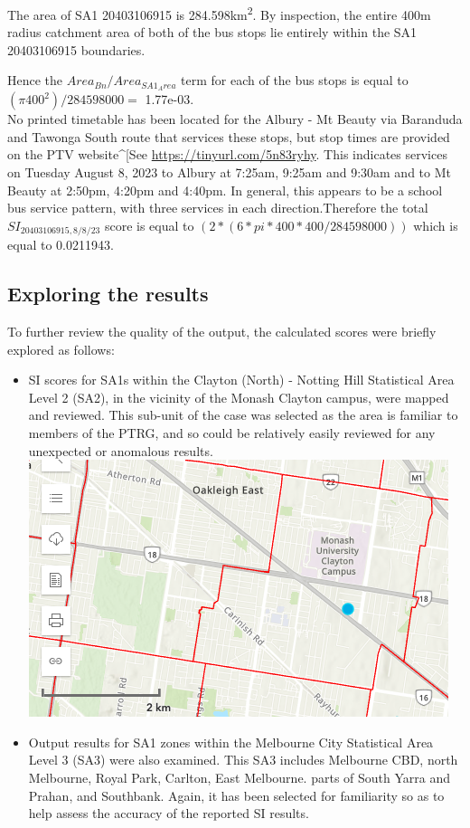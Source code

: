 \documentclass[]{tufte-book}
\begin{document}
The area of SA1 20403106915 is 284.598km\textsuperscript{2}. By
inspection, the entire 400m radius catchment area of both of the bus
stops lie entirely within the SA1 20403106915 boundaries.

Hence the \(Area_{Bn}/ Area_{SA1_Area}\) term for each of the bus stops
is equal to \((\pi 400^2) / 284598000 =\) 1.77e-03.\\
No printed timetable has been located for the Albury - Mt Beauty via
Baranduda and Tawonga South route that services these stops, but stop
times are provided on the PTV website\^{}{[}See
\url{https://tinyurl.com/5n83ryhy}. This indicates services on Tuesday
August 8, 2023 to Albury at 7:25am, 9:25am and 9:30am and to Mt Beauty
at 2:50pm, 4:20pm and 4:40pm. In general, this appears to be a school
bus service pattern, with three services in each direction.Therefore the
total \(SI_{20403106915, 8/8/23}\) score is equal to
\((2*(6* pi * 400 * 400 / 284598000))\) which is equal to 0.0211943.

\hypertarget{exploring-the-results}{%
\subsection{Exploring the results}\label{exploring-the-results}}

To further review the quality of the output, the calculated scores were
briefly explored as follows:

\begin{itemize}
\item
  SI scores for SA1s within the Clayton (North) - Notting Hill
  Statistical Area Level 2 (SA2), in the vicinity of the Monash Clayton
  campus, were mapped and reviewed. This sub-unit of the case was
  selected as the area is familiar to members of the PTRG, and so could
  be relatively easily reviewed for any unexpected or anomalous results.
  \includegraphics{images/Clayton.png}
\item
  Output results for SA1 zones within the Melbourne City Statistical
  Area Level 3 (SA3) were also examined. This SA3 includes Melbourne
  CBD, north Melbourne, Royal Park, Carlton, East Melbourne. parts of
  South Yarra and Prahan, and Southbank. Again, it has been selected for
  familiarity so as to help assess the accuracy of the reported SI
  results.
\end{itemize}
\end{document}
